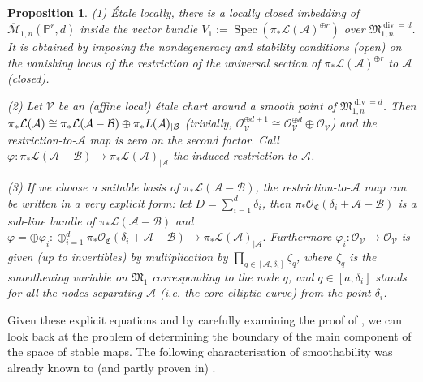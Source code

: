 \documentclass[11pt]{amsart}
\newcommand{\M}[4]{\overline{\mathcal M}_{#1,#2}(#3,#4)}
\newcommand{\PP}{\mathbb P}
\renewcommand{\to}{\rightarrow}
\newcommand{\A}{\mathcal A}
\newcommand{\B}{\mathcal B}
\theoremstyle{plain}
\newtheorem{prop}[thm]{Proposition}
\theoremstyle{definition}
\begin{document}
\begin{prop}
\emph{(1)} \'{E}tale locally, there is a locally closed imbedding of $\M{1}{n}{\PP^r}{d}$ inside the vector bundle $V_1:=\operatorname{Spec}(\pi_*\mathcal L(\A)^{\oplus r})$ over $\mathfrak M_{1,n}^{\operatorname{div}=d}$. It is obtained by imposing the nondegeneracy and stability conditions \emph{(open)} on the vanishing locus of the restriction of the universal section of $\pi_*\mathcal L(\A)^{\oplus r}$ to $\A$ \emph{(closed)}.

\emph{(2)} Let $\mathcal V$ be an (affine local) \'{e}tale chart around a smooth point of $\mathfrak M_{1,n}^{\operatorname{div}=d}$. Then $\pi_*\mathcal L(\A)\cong \pi_*\mathcal L(\A-\B)\oplus \pi_*\mathcal \mathcal L(\A)_{|\B}$ (trivially, $\mathcal O_{\mathcal V}^{\oplus d+1}\cong\mathcal O_{\mathcal V}^{\oplus d}\oplus\mathcal O_{\mathcal V}$) and the restriction-to-$\A$ map is zero on the second factor. Call $\varphi\colon \pi_*\mathcal L(\A-\B)\to\pi_*\mathcal L(\A)_{|\A}$ the induced  restriction to $\A$.

\emph{(3)} If we choose a suitable basis of $\pi_*\mathcal L(\A-\B)$, the restriction-to-$\A$ map can be written in a very explicit form: let $D=\sum_{i=1}^d\delta_i$, then $\pi_*\mathcal O_{\mathfrak C}(\delta_i+\A-\B)$ is a sub-line bundle of $\pi_*\mathcal L(\A-\B)$ and $\varphi=\oplus\varphi_i\colon\oplus_{i=1}^d \pi_*\mathcal O_{\mathfrak C}(\delta_i+\A-\B)\to \pi_*\mathcal L(\A)_{|\A}.$ Furthermore $\varphi_i\colon\mathcal O_\mathcal V\to\mathcal O_\mathcal V$ is given (up to invertibles) by multiplication by $\prod_{q\in[\A,\delta_i]}\zeta_q$, where $\zeta_q$ is the smoothening variable on $\mathfrak M_1$ corresponding to the node $q$, and $q\in[a,\delta_i]$ stands for all the nodes separating $\A$ (i.e. the core elliptic curve) from the point $\delta_i$.
\end{prop}

Given these explicit equations and by carefully examining the proof of \cite[Prop. 4.13]{HL}, we can look back at the problem of determining the boundary of the main component of the space of stable maps. The following characterisation of smoothability was already known to (and partly proven in) \cite[Lem. 5.9]{Vre}.
\end{document}
